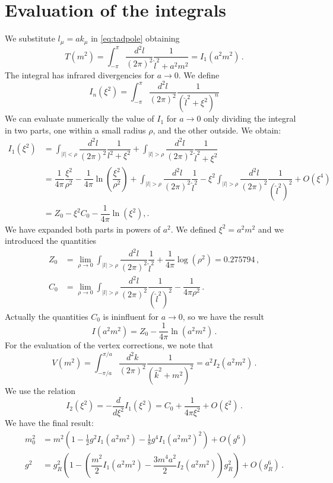 \documentclass[12pt,a4paper]{report}
\begin{document}
 \section{Evaluation of the integrals}
 
 We substitute $l_\mu = a k_\mu$ in \eqref{eq:tadpole} obtaining \begin{equation}
 T( m^2) =  \int_{-\pi}^\pi \dfrac{d^2l}{(2 \pi)^2}\dfrac{1}{\hat l^2 + a^2m^2} =  I_1(a^2 m^2) \,.
 \end{equation} The integral has infrared divergencies for $a \to 0$. We define \begin{equation}
 I_n(\xi^2) = \int_{-\pi}^\pi \dfrac{d^2l}{(2 \pi)^2}\dfrac{1}{(\hat l^2 + \xi^2)^n}
\end{equation}  We can evaluate numerically the value of $I_1$ for $a\to 0$ only dividing the integral in two parts, one within a small radius $\rho$, and the other outside.
 We obtain:
 \begin{align}
 I_1(\xi^2) &= \int_{|l|< \rho} \dfrac{d^2l}{(2 \pi)^2} \dfrac{1}{l^2 + \xi^2} +\int_{|l|> \rho} \dfrac{d^2l}{(2 \pi)^2} \dfrac{1}{\hat l^2 + \xi^2}  \\
 &= \dfrac{1}{4 \pi} \dfrac{\xi^2}{\rho^2} - \dfrac{1}{4 \pi} \ln \left( \dfrac{\xi^2}{\rho^2}\right) + \int_{|l|> \rho} \dfrac{d^2l}{(2 \pi)^2} \dfrac{1}{\hat l^2 } - \xi^2 \int_{|l|> \rho} \dfrac{d^2l}{(2 \pi)^2} \dfrac{1}{(\hat l^2)^2}  +O(\xi^4) \nonumber \\
 &= Z_0 -\xi^2 C_0 -\dfrac{1}{4 \pi} \ln(\xi^2) ,. \nonumber
 \end{align} We have expanded both parts in powers of $a^2$. We defined $\xi^2 = a^2 m^2$ and we introduced the quantities
\begin{align}
Z_0 &= \lim_{\rho \to 0} \int_{|l|> \rho}  \dfrac{d^2l}{(2 \pi)^2} \dfrac{1}{\hat l^2 } + \dfrac{1}{4 \pi} \log(\rho^2)=0.275794 \,, \\
C_0 &= \lim_{\rho \to 0}  \int_{|l|> \rho}  \dfrac{d^2l}{(2 \pi)^2} \dfrac{1}{(\hat l^2)^2 } - \dfrac{1}{4 \pi \rho^2} \,.
\end{align} Actually the quantities $C_0$ is ininfluent for $a\to 0$, so we have the result \begin{equation}
I(a^2 m^2)= Z_0 - \dfrac{1}{4 \pi} \ln(a^2m^2) \,.
\end{equation} For the evaluation of the vertex corrections, we note that \begin{equation}
V(m^2) = \int_{-\pi/a}^{\pi/a} \dfrac{d^2k}{(2 \pi)^2}\dfrac{1}{(\hat k^2 + m^2)^2} = a^2 I_2(a^2 m^2) \,.
\end{equation} We use the relation \begin{equation}
I_2(\xi^2) = - \dfrac{d}{d\xi^2} I_1(\xi^2) = C_0 + \dfrac{1}{4 \pi \xi^2} + O(\xi^2) \,.
\end{equation} We have the final result: \begin{align}
  m_0^2 &=  m^2(1 - \frac{1}{2}g^2 I_1( a^2 m^2) - \frac{1}{8} g^4 I_1(a^2 m^2)^2 ) + O( g^6 ) \\
g^2 &= g_R^2(1- (\dfrac{m^2}{2}I_1(a^2 m^2) - \dfrac{3m^4a^2}{2} I_2(a^2m^2) )g_R^2) + O(g_R^6) \,.
\end{align}
 
\end{document}

